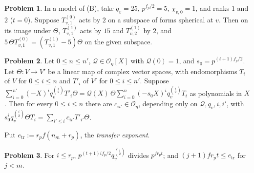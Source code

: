 \documentclass[reqno]{amsart}
\theoremstyle{plain}
\theoremstyle{definition}
\newtheorem{problem}{Problem}[section]
\theoremstyle{remark}
\newcommand{\Oc}{\mathcal O}
\newcommand{\Qc}{\mathcal Q}
\newcommand{\tr}{e_{\mathrm{tr}}}
\begin{document}
\begin{problem}\label{pr:transfer-model}
In a model of (B), take \(q_v=25\), \(p^{f_p/2}=5\), \(\chi_{v,0}=1\), and ranks \(1\) and \(2\) (\(t=0\)).  Suppose \(T^{(0)}_{v,1}\) acts by \(2\) on a subspace of forms spherical at \(v\).  Then on its image under \(\Theta\), \(T^{(1)}_{v,1}\) acts by \(15\) and \(T^{(1)}_{v,2}\) by \(2\), and \(5\,\Theta T^{(0)}_{v,1}=(T^{(1)}_{v,1}-5)\Theta\) on the given subspace.
\end{problem}

\begin{problem}\label{pr:triangular}
Let \(0\le n\le n'\), \(\Qc\in\Oc_\eta[X]\) with \(\Qc(0)=1\), and \(s_0=p^{(t+1)f_p/2}\).  Let \(\Theta\colon V\to V'\) be a linear map of complex vector spaces, with endomorphisms \(T_i\) of \(V\) for \(0\le i\le n\) and \(T'_i\) of \(V'\) for \(0\le i\le n'\).  Suppose \(\sum_{i=0}^{n'}(-X)^i q_v^{\binom i2}T'_i\Theta=\Qc(X)\,\Theta\sum_{i=0}^{n}(-s_0 X)^i q_v^{\binom i2}T_i\) as polynomials in \(X\).  Then for every \(0\le i\le n\) there are \(c_{ii'}\in\Oc_\eta\), depending only on \(\Qc,q_v,i,i'\), with \(s_0^i q_v^{\binom i2}\Theta T_i=\sum_{i'\le i}c_{ii'}T'_{i'}\Theta\).
\end{problem}

Put \(\tr := r_p f(n_m + r_p)\), the \emph{transfer exponent}.

\begin{problem}\label{pr:scalar}
For \(i \le r_p\), \(p^{(t+1)if_p/2}q_v^{\binom i2}\) divides \(p^{fr_pt}\); and \((j+1) f r_p t \le \tr\) for \(j < m\).
\end{problem}
\end{document}
